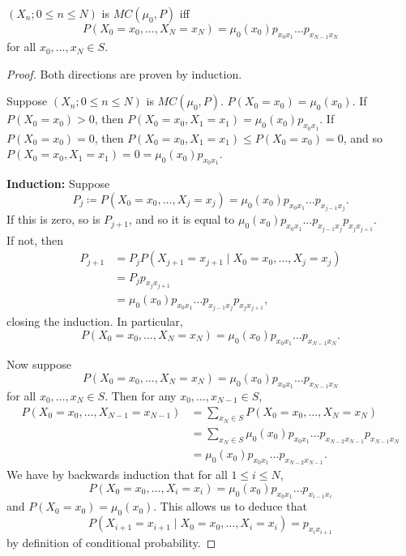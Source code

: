 \begin{theorem}
    $(X_n; 0 \le n \le N)$ is $MC(\mu_0, P)$ iff \[
        P(X_0 = x_0, \dots, X_N = x_N) = \mu_0(x_0) p_{x_0 x_1} \dots p_{x_{N-1} x_N}
    \] for all $x_0, \dots, x_N \in S$.
\end{theorem}
\begin{proof}
    Both directions are proven by induction.

    Suppose $(X_n; 0 \le n \le N)$ is $MC(\mu_0, P)$.
    $P(X_0 = x_0) = \mu_0(x_0)$.
    If $P(X_0 = x_0) > 0$, then
    $P(X_0 = x_0, X_1 = x_1) = \mu_0(x_0) p_{x_0 x_1}$.
    If $P(X_0 = x_0) = 0$, then $P(X_0 = x_0, X_1 = x_1) \le P(X_0 = x_0) = 0$,
    and so $P(X_0 = x_0, X_1 = x_1) = 0 = \mu_0(x_0) p_{x_0 x_1}$.

    \textbf{Induction:} Suppose \[
        P_j \coloneq P(X_0 = x_0, \dots, X_j = x_j)
        = \mu_0(x_0) p_{x_0 x_1} \dots p_{x_{j-1} x_j}.
    \] If this is zero, so is $P_{j+1}$, and so it is equal to
    $\mu_0(x_0) p_{x_0 x_1} \dots p_{x_{j-1} x_j} p_{x_j x_{j+1}}$. \\
    If not, then \begin{align*}
        P_{j+1}
            &= P_j P(X_{j+1} = x_{j+1} \mid X_0 = x_0, \dots, X_j = x_j) \\
            &= P_j p_{x_j x_{j+1}} \\
            &= \mu_0(x_0) p_{x_0 x_1} \dots p_{x_{j-1} x_j} p_{x_j x_{j+1}},
    \end{align*} closing the induction.
    In particular, \[
        P(X_0 = x_0, \dots, X_N = x_N) = \mu_0(x_0) p_{x_0 x_1} \dots
        p_{x_{N-1} x_N}.
    \]

    Now suppose \[
        P(X_0 = x_0, \dots, X_N = x_N)
        = \mu_0(x_0) p_{x_0 x_1} \dots p_{x_{N-1} x_N}
    \]
    for all $x_0, \dots, x_N \in S$.
    Then for any $x_0, \dots, x_{N-1} \in S$,
    \begin{align*}
        P(X_0 = x_0, \dots, X_{N-1} = x_{N-1})
            &= \sum_{x_N \in S} P(X_0 = x_0, \dots, X_N = x_N) \\
            &= \sum_{x_N \in S} \mu_0(x_0) p_{x_0 x_1} \dots 
                p_{x_{N-2} x_{N-1}} p_{x_{N-1} x_N} \\
            &= \mu_0(x_0) p_{x_0 x_1} \dots p_{x_{N-2} x_{N-1}}.
    \end{align*}
    We have by backwards induction that for all $1 \le i \le N$, \[
        P(X_0 = x_0, \dots, X_i = x_i)
        = \mu_0(x_0) p_{x_0 x_1} \dots p_{x_{i-1} x_i}
    \] and $P(X_0 = x_0) = \mu_0(x_0)$.
    This allows us to deduce that \[
        P(X_{i+1} = x_{i+1} \mid X_0 = x_0, \dots, X_i = x_i)
        = p_{x_i x_{i+1}}
    \] by definition of conditional probability.
\end{proof}

